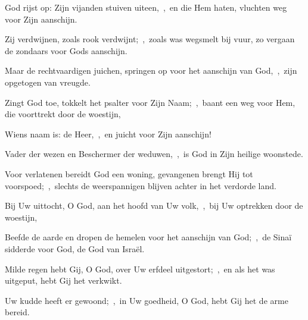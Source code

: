\documentclass[12pt,twoside,a5paper]{article}
\begin{document}






\begin{halfparskip}
  God rijst op: Zijn vijanden stuiven uiteen,~\sep\ en die Hem haten, vluchten weg voor Zijn aanschijn.


  Zij verdwijnen, zoals rook verdwijnt;~\sep\ zoals was wegsmelt bij vuur, zo vergaan de zondaars voor Gods aanschijn.

  Maar de rechtvaardigen juichen, springen op voor het aanschijn van God,~\sep\ zijn opgetogen van vreugde.

  Zingt God toe, tokkelt het psalter voor Zijn Naam;~\sep\ baant een weg voor Hem, die voorttrekt door de woestijn,

  Wiens naam is: de Heer,~\sep\ en juicht voor Zijn aanschijn!

  Vader der wezen en Beschermer der weduwen,~\sep\ is God in Zijn heilige woonstede.

  Voor verlatenen bereidt God een woning, gevangenen brengt Hij tot voorspoed;~\sep\ slechts de weerspannigen blijven achter in het verdorde land.
\end{halfparskip}


\begin{halfparskip}
  Bij Uw uittocht, O God, aan het hoofd van Uw volk,~\sep\ bij Uw optrekken door de woestijn,

  Beefde de aarde en dropen de hemelen voor het aanschijn van God;~\sep\ de Sinaï sidderde voor God, de God van Israël.

  Milde regen hebt Gij, O God, over Uw erfdeel uitgestort;~\sep\ en als het was uitgeput, hebt Gij het verkwikt.

  Uw kudde heeft er gewoond;~\sep\ in Uw goedheid, O God, hebt Gij het de arme bereid.
\end{halfparskip}
\end{document}
